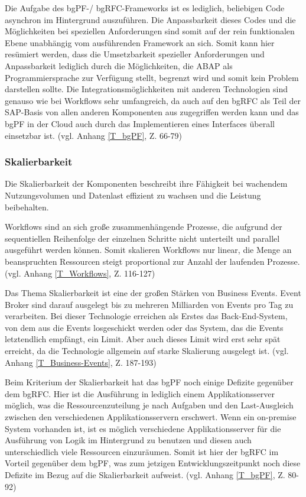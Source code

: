 Die Aufgabe des bgPF-/ bgRFC-Frameworks ist es lediglich, beliebigen Code asynchron im Hintergrund auszuführen. Die Anpassbarkeit dieses Codes und die Möglichkeiten bei speziellen Anforderungen sind somit auf der rein funktionalen Ebene unabhängig vom ausführenden Framework an sich. Somit kann hier resümiert werden, dass die Umsetzbarkeit spezieller Anforderungen und Anpassbarkeit lediglich durch die Möglichkeiten, die ABAP als Programmiersprache zur Verfügung stellt, begrenzt wird und somit kein Problem darstellen sollte. Die Integrationsmöglichkeiten mit anderen Technologien sind genauso wie bei Workflows sehr umfangreich, da auch auf den bgRFC als Teil der SAP-Basis von allen anderen Komponenten aus zugegriffen werden kann und das bgPF in der Cloud auch durch das Implementieren eines Interfaces überall einsetzbar ist. (vgl. Anhang \ref{T_bgPF}, Z. 66-79)

\subsubsection{Skalierbarkeit}

Die Skalierbarkeit der Komponenten beschreibt ihre Fähigkeit bei wachendem Nutzungsvolumen und Datenlast effizient zu wachsen und die Leistung beibehalten.

Workflows sind an sich gro{\ss}e zusammenhängende Prozesse, die aufgrund der sequentiellen Reihenfolge der einzelnen Schritte nicht unterteilt und \zB parallel ausgeführt werden können. Somit skalieren Workflows nur linear, die Menge an beanspruchten Ressourcen steigt proportional zur Anzahl der laufenden Prozesse. (vgl. Anhang \ref{T_Workflows}, Z. 116-127)

Das Thema Skalierbarkeit ist eine der gro{\ss}en Stärken von Business Events. Event Broker sind darauf ausgelegt bis zu mehreren Milliarden von Events pro Tag zu verarbeiten. Bei dieser Technologie erreichen als Erstes das Back-End-System, von dem aus die Events losgeschickt werden oder das System, das die Events letztendlich empfängt, ein Limit. Aber auch dieses Limit wird erst sehr spät erreicht, da die Technologie allgemein auf starke Skalierung ausgelegt ist. (vgl. Anhang \ref{T_Business-Events}, Z. 187-193)

Beim Kriterium der Skalierbarkeit hat das bgPF noch einige Defizite gegenüber dem bgRFC. Hier ist die Ausführung in lediglich einem Applikationsserver möglich, was die Ressourcenzuteilung je nach Aufgaben und den Last-Ausgleich zwischen den verschiedenen Applikationsservern erschwert. Wenn ein on-premise System vorhanden ist, ist es möglich verschiedene Applikationsserver für die Ausführung von Logik im Hintergrund zu benutzen und diesen auch unterschiedlich viele Ressourcen einzuräumen. Somit ist hier der bgRFC im Vorteil gegenüber dem bgPF, was zum jetzigen Entwicklungszeitpunkt noch diese Defizite im Bezug auf die Skalierbarkeit aufweist. (vgl. Anhang \ref{T_bgPF}, Z. 80-92)

